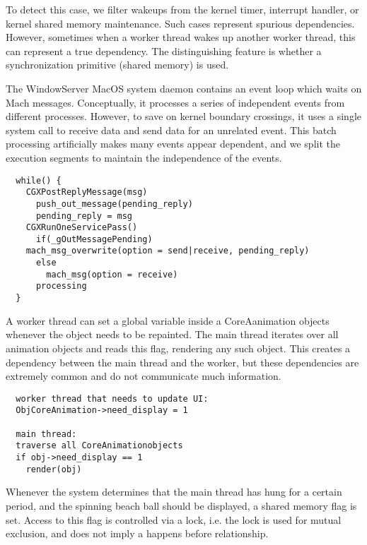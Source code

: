 To detect this case, we filter wakeups from the kernel timer, interrupt
handler, or kernel shared memory maintenance. Such cases represent spurious
dependencies. However, sometimes when a worker thread wakes up another worker
thread, this can represent a true dependency. The distinguishing feature is
whether a synchronization primitive (shared memory) is used.

The WindowServer MacOS system daemon contains an event loop which waits on Mach
messages. Conceptually, it processes a series of independent events from
different processes. However, to save on kernel boundary crossings, it uses a
single system call to receive data and send data for an unrelated event. This
batch processing artificially makes many events appear dependent, and we split
the execution segments to maintain the independence of the events.
{\footnotesize \begin{verbatim}
  while() {
    CGXPostReplyMessage(msg)
      push_out_message(pending_reply)
      pending_reply = msg
    CGXRunOneServicePass()
      if(_gOutMessagePending)
	mach_msg_overwrite(option = send|receive, pending_reply)
      else
        mach_msg(option = receive)
      processing
  }
\end{verbatim}
}

A worker thread can set a global variable inside a CoreAanimation objects
whenever the object needs to be repainted. The main thread iterates over all
animation objects and reads this flag, rendering any such object. This creates
a dependency between the main thread and the worker, but these dependencies are
extremely common and do not communicate much information.

{\footnotesize \begin{verbatim}
  worker thread that needs to update UI:
  ObjCoreAnimation->need_display = 1

  main thread:
  traverse all CoreAnimationobjects
  if obj->need_display == 1
    render(obj)
\end{verbatim}
}

Whenever the system determines that the main thread has hung for a certain
period, and the spinning beach ball should be displayed, a shared memory flag
is set. Access to this flag is controlled via a lock, i.e. the lock is used for
mutual exclusion, and does not imply a happens before relationship.

